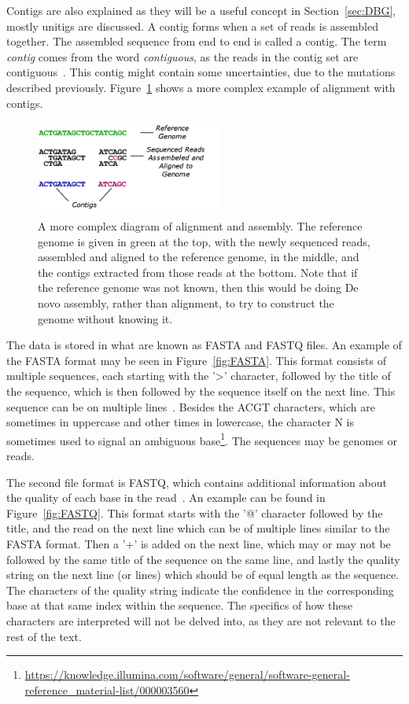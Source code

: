 Contigs are also explained as they will be a useful concept in Section~\ref{sec:DBG}, mostly unitigs are discussed.
A contig forms when a set of reads is assembled together.
The assembled sequence from end to end is called a contig.
The term \textit{contig} comes from the word \textit{contiguous}, as the reads in the contig set are contiguous~\cite{Contig}.
This contig might contain some uncertainties, due to the mutations described previously.
Figure~\ref{fig:AssemblyAndAlignment} shows a more complex example of alignment with contigs.

\begin{figure}[t]
  \centering
  \includegraphics[width=0.55\textwidth]{images/AssemblyAndAlignment.png}
  \caption{A more complex diagram of alignment and assembly. The reference genome is given in green at the top, with the newly sequenced reads, assembled and aligned to the reference genome, in the middle, and the contigs extracted from those reads at the bottom. Note that if the reference genome was not known, then this would be doing De novo assembly, rather than alignment, to try to construct the genome without knowing it.}\label{fig:AssemblyAndAlignment}
\end{figure}

The data is stored in what are known as FASTA and FASTQ files.
An example of the FASTA format may be seen in Figure~\ref{fig:FASTA}.
This format consists of multiple sequences, each starting with the '>' character, followed by the title of the sequence, which is then followed by the sequence itself on the next line.
This sequence can be on multiple lines~\cite{FastaAndFastq}.
Besides the ACGT characters, which are sometimes in uppercase and other times in lowercase, the character N is sometimes used to signal an ambiguous base\footnote{\url{https://knowledge.illumina.com/software/general/software-general-reference_material-list/000003560}}.
The sequences may be genomes or reads.

The second file format is FASTQ, which contains additional information about the quality of each base in the read~\cite{FastaAndFastq}.
An example can be found in Figure~\ref{fig:FASTQ}.
This format starts with the '@' character followed by the title, and the read on the next line which can be of multiple lines similar to the FASTA format.
Then a '+' is added on the next line, which may or may not be followed by the same title of the sequence on the same line, and lastly the quality string on the next line (or lines) which should be of equal length as the sequence.
The characters of the quality string indicate the confidence in the corresponding base at that same index within the sequence.
The specifics of how these characters are interpreted will not be delved into, as they are not relevant to the rest of the text.

